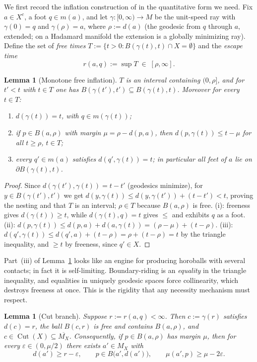 \documentclass[11pt]{article}
\newtheorem{lemma}[theorem]{Lemma}
\theoremstyle{remark}
\newcommand{\X}{X}
\newcommand{\Mx}{M_{\X}}
\newcommand{\Cut}{\operatorname{Cut}}
\newcommand{\B}{B}
\begin{document}
We first record the inflation construction of \cite[Thm.~3.1]{R1} in
the quantitative form we need. Fix $a\in\X^{c}$, a foot $q\in m(a)$,
and let $\gamma:[0,\infty)\to M$ be the unit-speed ray with
$\gamma(0)=q$ and $\gamma(\rho)=a$, where $\rho:=d(a)$ (the geodesic
from $q$ through $a$, extended; on a Hadamard manifold the extension
is a globally minimizing ray). Define the set of \emph{free times}
$T:=\{t>0 : \B(\gamma(t),t)\cap\X=\emptyset\}$ and the
\emph{escape time}
\[
r(a,q):=\sup T\;\in\;[\rho,\infty].
\]

\begin{lemma}[Monotone free inflation]\label{lem:monotone}
$T$ is an interval containing $(0,\rho]$, and for $t'<t$ with
$t\in T$ one has $\B(\gamma(t'),t')\subseteq\B(\gamma(t),t)$.
Moreover for every $t\in T$:
\begin{enumerate}[label=(\roman*)]
\item $d(\gamma(t))=t$, with $q\in m(\gamma(t))$;
\item if $p\in\B(a,\rho)$ with margin $\mu=\rho-d(p,a)$, then
$d(p,\gamma(t))\le t-\mu$ for all $t\ge\rho$, $t \in T$;
\item every $q'\in m(a)$ satisfies $d(q',\gamma(t))=t$; in
particular all feet of $a$ lie on $\partial\B(\gamma(t),t)$.
\end{enumerate}
\end{lemma}

\begin{proof}
Since $d(\gamma(t'),\gamma(t))=t-t'$ (geodesics minimize), for
$y\in\B(\gamma(t'),t')$ we get
$d(y,\gamma(t))\le d(y,\gamma(t'))+(t-t')<t$, proving the nesting and
that $T$ is an interval; $\rho\in T$ because $\B(a,\rho)$ is free.
(i): freeness gives $d(\gamma(t))\ge t$, while
$d(\gamma(t),q)=t$ gives $\le$ and exhibits $q$ as a foot. (ii):
$d(p,\gamma(t))\le d(p,a)+d(a,\gamma(t))=(\rho-\mu)+(t-\rho)$. (iii):
$d(q',\gamma(t))\le d(q',a)+(t-\rho)=\rho+(t-\rho)=t$ by the triangle
inequality, and $\ge t$ by freeness, since $q'\in\X$.
\end{proof}

Part~(iii) of Lemma~\ref{lem:monotone} looks like an
engine for producing horoballs with several contacts; in fact it is
self-limiting. Boundary-riding is an \emph{equality} in the triangle
inequality, and equalities in uniquely geodesic spaces force collinearity,
which destroys freeness at once. This is the rigidity that any necessity
mechanism must respect.

\begin{lemma}[Cut branch]\label{lem:cutbranch}
Suppose $r:=r(a,q)<\infty$. Then $c:=\gamma(r)$ satisfies $d(c)=r$,
the ball $\B(c,r)$ is free and contains $\B(a,\rho)$, and
$c\in\Cut(\X)\subseteq\overline{\Mx}$. Consequently, if
$p\in\B(a,\rho)$ has margin $\mu$, then for every
$\varepsilon\in(0,\mu/2)$ there exists $a'\in\Mx$ with
\[
d(a')\ge r-\varepsilon,\qquad
p\in\B\bigl(a',d(a')\bigr),\qquad
\mu(a',p)\ge\mu-2\varepsilon .
\]
\end{lemma}
\end{document}
